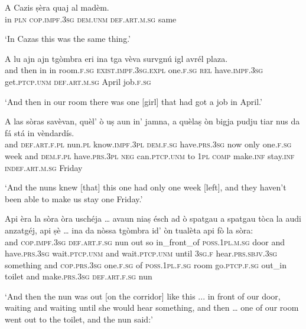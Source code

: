 \begin{linenumbers}
\gll    A Cazis ṣèra quaj al madèm.\\
in \textsc{pln} \textsc{cop.impf.3sg} \textsc{dem.unm} \textsc{def.art.m.sg} same\\
\end{linenumbers}
\medskip
\glt `In Cazas this was the same thing.'
\medskip

\begin{linenumbers}
\gll A lu ajn ajn tgòmbra eri ina tga vèva survgnú igl avrél plaza.\\
and then in in room.\textsc{f.sg} \textsc{exist.impf.3sg.expl} one.\textsc{f.sg} \textsc{rel} have.\textsc{impf.3sg} get.\textsc{ptcp.unm} \textsc{def.art.m.sg} April  job.\textsc{f.sg}\\
\end{linenumbers}
\medskip
\glt `And then in our room there was one [girl] that had got a job in April.'
\medskip

\begin{linenumbers}
\gll    A las sòras savèvan, quèl’ ò uṣ aun in’ jamna, a quèlaṣ òn bigja pudju tiar nus da fá stá in vèndardís.\\
and \textsc{def.art.f.pl} nun.\textsc{pl} know.\textsc{impf.3pl} \textsc{dem.f.sg} have.\textsc{prs.3sg} now only one.\textsc{f.sg} week and \textsc{dem.f.pl} have.\textsc{prs.3pl} \textsc{neg} can.\textsc{ptcp.unm} to \textsc{1pl} \textsc{comp} make.\textsc{inf} stay.\textsc{inf} \textsc{indef.art.m.sg} Friday\\
\end{linenumbers}
\medskip
\glt `And the nuns knew [that] this one had only one week [left], and they haven’t been able to make us stay one Friday.'
\medskip

\begin{linenumbers}
\gll    Api èra la sòra òra uschéja … avaun niaṣ ésch ad ò spatgau a spatgau tòca la audi anzatgéj, api ṣè …  ina da nòssa tgòmbra id’ òn tualèta api fò la sòra:\\
and \textsc{cop.impf.3sg} \textsc{def.art.f.sg} nun out so {} in\_front\_of \textsc{poss.1pl.m.sg} door and have.\textsc{prs.3sg} wait.\textsc{ptcp.unm} and wait.\textsc{ptcp.unm} until \textsc{3sg.f} hear.\textsc{prs.sbjv.3sg} something and \textsc{cop.prs.3sg} {} one.\textsc{f.sg} of \textsc{poss.1pl.f.sg} room go.\textsc{ptcp.f.sg} out\_in toilet and make.\textsc{prs.3sg} \textsc{def.art.f.sg} nun\\
\end{linenumbers}
\medskip
\glt `And then the nun was out [on the corridor] like this ... in front of our door, waiting and waiting until she would hear something, and then … one of our room went out to the toilet, and the nun said:'
\medskip

